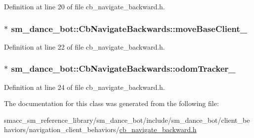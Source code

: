 Definition at line 20 of file cb\+\_\+navigate\+\_\+backward.\+h.

\subsubsection[{\texorpdfstring{move\+Base\+Client\+\_\+}{moveBaseClient_}}]{$\ast$ sm\+\_\+dance\+\_\+bot\+::\+Cb\+Navigate\+Backwards\+::move\+Base\+Client\+\_\+}\hypertarget{classsm__dance__bot_1_1CbNavigateBackwards_a8dea4225f55f14bf0a941baae383b07f}{}\label{classsm__dance__bot_1_1CbNavigateBackwards_a8dea4225f55f14bf0a941baae383b07f}


Definition at line 22 of file cb\+\_\+navigate\+\_\+backward.\+h.

\subsubsection[{\texorpdfstring{odom\+Tracker\+\_\+}{odomTracker_}}]{$\ast$ sm\+\_\+dance\+\_\+bot\+::\+Cb\+Navigate\+Backwards\+::odom\+Tracker\+\_\+}\hypertarget{classsm__dance__bot_1_1CbNavigateBackwards_a2fd4de5f0f4f7bf374d8bfbfd87c6bf2}{}\label{classsm__dance__bot_1_1CbNavigateBackwards_a2fd4de5f0f4f7bf374d8bfbfd87c6bf2}


Definition at line 24 of file cb\+\_\+navigate\+\_\+backward.\+h.



The documentation for this class was generated from the following file\+:\begin{DoxyCompactItemize}
\item 
smacc\+\_\+sm\+\_\+reference\+\_\+library/sm\+\_\+dance\+\_\+bot/include/sm\+\_\+dance\+\_\+bot/client\+\_\+behaviors/navigation\+\_\+client\+\_\+behaviors/\hyperlink{cb__navigate__backward_8h}{cb\+\_\+navigate\+\_\+backward.\+h}\end{DoxyCompactItemize}
